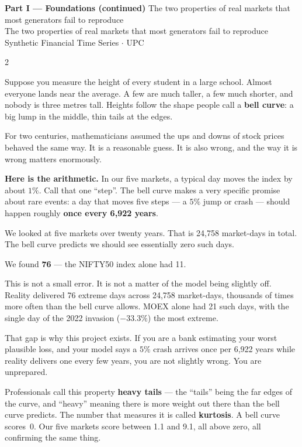 \documentclass[10pt]{article}
\newcommand{\redbox}[2]{\begin{tcolorbox}[mybox={DRed}{RBg},title={#1}]#2\end{tcolorbox}}
\newcommand{\pagehead}[2]{%
  \begin{tcolorbox}[enhanced,arc=0pt,outer arc=0pt,boxrule=0pt,
    colback=Navy,colframe=Navy,
    top=5pt,bottom=5pt,left=8pt,right=8pt,
    before skip=0pt,after skip=10pt]
  {\color{white}\large\bfseries #1}%
  \ifx\relax#2\relax\else\\[1pt]{\color{blue!30!white}\small #2}\fi
  \hfill{\color{blue!20!white}\footnotesize Synthetic Financial Time Series $\cdot$ UPC}
  \end{tcolorbox}}
\begin{document}
\clearpage

\pagehead{Part I --- Foundations (continued)}
         {The two properties of real markets that most generators fail to reproduce}

\begin{multicols}{2}

\redbox{3\quad The Bell Curve Fails}{%
Suppose you measure the height of every student in a large school. Almost everyone lands near the average. A few are much taller, a few much shorter, and nobody is three metres tall. Heights follow the shape people call a \textbf{bell curve}: a big lump in the middle, thin tails at the edges.

For two centuries, mathematicians assumed the ups and downs of stock prices behaved the same way. It is a reasonable guess. It is also wrong, and the way it is wrong matters enormously.

\medskip
\textbf{Here is the arithmetic.} In our five markets, a typical day moves the index by about $1\%$. Call that one ``step''. The bell curve makes a very specific promise about rare events: a day that moves five steps --- a $5\%$ jump or crash --- should happen roughly \textbf{once every 6,922 years}.

We looked at five markets over twenty years. That is 24,758 market-days in total. The bell curve predicts we should see essentially zero such days.

\medskip
We found \textbf{76} --- the NIFTY50 index alone had 11.

\medskip
This is not a small error. It is not a matter of the model being slightly off. Reality delivered 76 extreme days across 24,758 market-days, thousands of times more often than the bell curve allows. MOEX alone had 21 such days, with the single day of the 2022 invasion ($-33.3\%$) the most extreme.

That gap is why this project exists. If you are a bank estimating your worst plausible loss, and your model says a $5\%$ crash arrives once per 6,922 years while reality delivers one every few years, you are not slightly wrong. You are unprepared.

Professionals call this property \textbf{heavy tails} --- the ``tails'' being the far edges of the curve, and ``heavy'' meaning there is more weight out there than the bell curve predicts. The number that measures it is called \textbf{kurtosis}. A bell curve scores~0. Our five markets score between 1.1 and 9.1, all above zero, all confirming the same thing.

}
\end{multicols}
\end{document}
